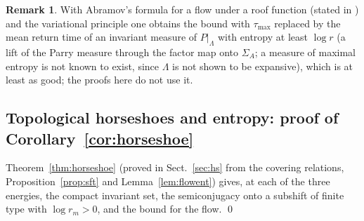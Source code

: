 \documentclass[11pt]{article}
\theoremstyle{definition}
\newtheorem{remark}{Remark}
\begin{document}
\begin{remark}
With Abramov's formula for a flow under a roof function \cite{abramov1959} (stated in \cite[Sect.~2]{kt2021}) and the variational principle one obtains the bound with $\tau_{\max}$ replaced by the mean return time of an invariant measure of $P|_\Lambda$ with entropy at least $\log r$ (a lift of the Parry measure through the factor map onto $\Sigma_A$; a measure of maximal entropy is not known to exist, since $\Lambda$ is not shown to be expansive), which is at least as good; the proofs here do not use it.
\end{remark}

\subsection{Topological horseshoes and entropy: proof of Corollary~\ref{cor:horseshoe}}

Theorem~\ref{thm:horseshoe} (proved in Sect.~\ref{sec:hs} from the covering relations, Proposition~\ref{prop:sft} and Lemma~\ref{lem:flowent}) gives, at each of the three energies, the compact invariant set, the semiconjugacy onto a subshift of finite type with $\log r_m > 0$, and the bound for the flow. \qed
\end{document}
